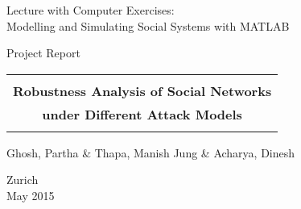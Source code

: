 \thispagestyle{empty}


\begin{center}

\bigskip


\bigskip


\bigskip


\LARGE{ 	Lecture with Computer Exercises:\\ }
\LARGE{ Modelling and Simulating Social Systems with MATLAB\\}

\bigskip

\bigskip

\small{Project Report}\\

\bigskip

\bigskip

\bigskip

\bigskip


\begin{tabular}{|c|}
\hline
\\
\textbf{\LARGE{Robustness Analysis of Social Networks}}\\
\textbf{\LARGE{under Different Attack Models}}\\
\\
\hline
\end{tabular}
\bigskip

\bigskip

\bigskip

\LARGE{Ghosh, Partha \& Thapa, Manish Jung \& Acharya, Dinesh}



\bigskip

\bigskip

\bigskip

\bigskip

\bigskip

\bigskip

\bigskip

\bigskip

Zurich\\
May 2015\\

\end{center}


